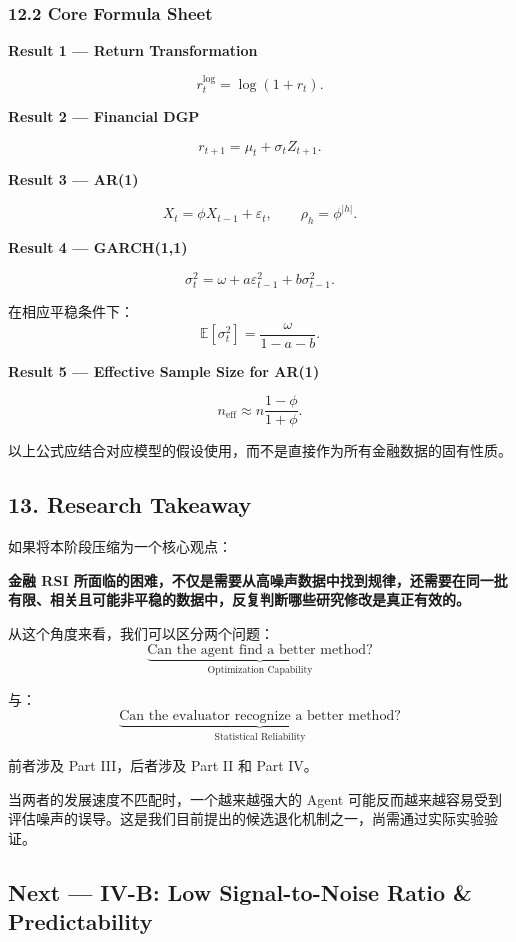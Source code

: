 \hypertarget{part-4-52-0680-core-formula-sheet}{%
\subsubsection{12.2 Core Formula Sheet}\label{part-4-52-0680-core-formula-sheet}}

\textbf{Result 1 --- Return Transformation}

\[r_t^{\log}=\log(1+r_t).\]

\textbf{Result 2 --- Financial DGP}

\[r_{t+1}
=
\mu_t+\sigma_tZ_{t+1}.\]

\textbf{Result 3 --- AR(1)}

\[X_t=\phi X_{t-1}+\varepsilon_t,
\qquad
\rho_h=\phi^{|h|}.\]

\textbf{Result 4 --- GARCH(1,1)}

\[\sigma_t^2
=
\omega+a\varepsilon_{t-1}^2+b\sigma_{t-1}^2.\]

在相应平稳条件下：
\[\mathbb E[\sigma_t^2]
=
\frac{\omega}{1-a-b}.\]

\textbf{Result 5 --- Effective Sample Size for AR(1)}

\[n_{\mathrm{eff}}
\approx
n\frac{1-\phi}{1+\phi}.\]

以上公式应结合对应模型的假设使用，而不是直接作为所有金融数据的固有性质。

\hypertarget{part-4-52-0680-research-takeaway}{%
\subsection{13. Research Takeaway}\label{part-4-52-0680-research-takeaway}}

如果将本阶段压缩为一个核心观点：

\textbf{金融 RSI 所面临的困难，不仅是需要从高噪声数据中找到规律，还需要在同一批有限、相关且可能非平稳的数据中，反复判断哪些研究修改是真正有效的。}

从这个角度来看，我们可以区分两个问题：
\[\underbrace{
\text{Can the agent find a better method?}
}_{\text{Optimization Capability}}\]

与：
\[\underbrace{
\text{Can the evaluator recognize a better method?}
}_{\text{Statistical Reliability}}\]

前者涉及 Part III，后者涉及 Part II 和 Part IV。

当两者的发展速度不匹配时，一个越来越强大的 Agent 可能反而越来越容易受到评估噪声的误导。这是我们目前提出的候选退化机制之一，尚需通过实际实验验证。

\hypertarget{part-4-52-0680-next-iv-b-low-signal-to-noise-ratio-predictability}{%
\subsection{Next --- IV-B: Low Signal-to-Noise Ratio \& Predictability}\label{part-4-52-0680-next-iv-b-low-signal-to-noise-ratio-predictability}}

